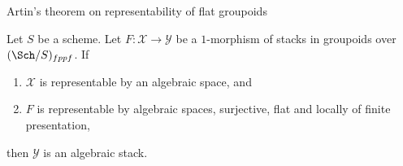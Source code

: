 %
\begin{theorem}
\label{theorem-bootstrap}
\begin{slogan}
Artin's theorem on representability of flat groupoids
\end{slogan}
Let $S$ be a scheme. Let $F : \mathcal{X} \to \mathcal{Y}$
be a $1$-morphism of stacks in groupoids over $(\Sch/S)_{fppf}$. If
\begin{enumerate}
\item $\mathcal{X}$ is representable by an algebraic space, and
\item $F$ is representable by algebraic spaces, surjective, flat and
locally of finite presentation,
\end{enumerate}
then $\mathcal{Y}$ is an algebraic stack.
\end{theorem}


